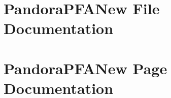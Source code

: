 \documentclass[a4paper]{book}
\begin{document}




















\chapter{Pandora\-PFANew File Documentation}


\chapter{Pandora\-PFANew Page Documentation}

\printindex
\end{document}

